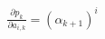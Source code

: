 \documentclass[preview]{standalone}
\begin{document}
\begin{align*}
\frac{\partial p_k}{\partial a_{i,k}} = ( \alpha _{k+1})^{i}
\end{align*}
\end{document}
